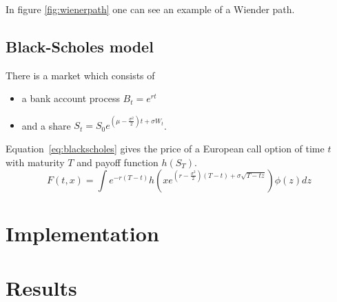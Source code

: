 
In figure \ref{fig:wienerpath} one can see an example of a Wiender
path.

\subsection{Black-Scholes model}

There is a market which consists of
\begin{itemize}
\item a bank account process $B_t = e^{rt}$
\item and a share $S_t = S_0 e^{(\mu - \frac{\sigma^2}{2}) t + \sigma W_t}$. 
\end{itemize}

Equation~\ref{eq:blackscholes} gives the price of a European call
option of time $t$ with maturity $T$ and payoff function $h(S_T)$.
\begin{equation}\label{eq:blackscholes}
 F(t,x) = \int e^{-r(T-t)}h(xe^{(r - \frac{\sigma^2}{2})(T-t)+\sigma \sqrt{T-tz}})\phi(z)dz 
\end{equation}

\section{Implementation}
\section{Results}

